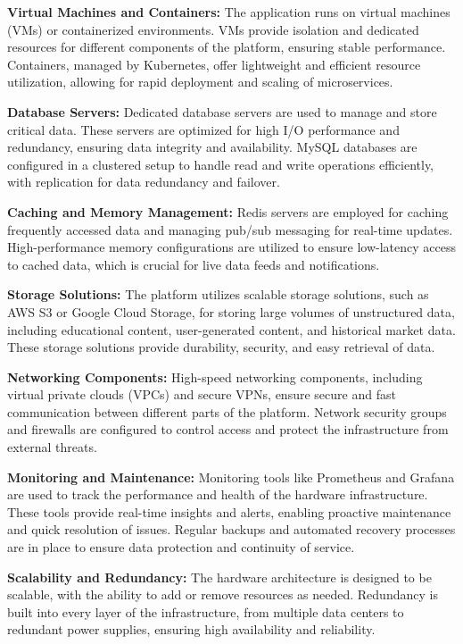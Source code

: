 \documentclass[12pt]{report}
\begin{document}
\textbf{Virtual Machines and Containers:} The application runs on virtual machines (VMs) or containerized environments. VMs provide isolation and dedicated resources for different components of the platform, ensuring stable performance. Containers, managed by Kubernetes, offer lightweight and efficient resource utilization, allowing for rapid deployment and scaling of microservices.

\textbf{Database Servers:} Dedicated database servers are used to manage and store critical data. These servers are optimized for high I/O performance and redundancy, ensuring data integrity and availability. MySQL databases are configured in a clustered setup to handle read and write operations efficiently, with replication for data redundancy and failover.

\textbf{Caching and Memory Management:} Redis servers are employed for caching frequently accessed data and managing pub/sub messaging for real-time updates. High-performance memory configurations are utilized to ensure low-latency access to cached data, which is crucial for live data feeds and notifications.

\textbf{Storage Solutions:} The platform utilizes scalable storage solutions, such as AWS S3 or Google Cloud Storage, for storing large volumes of unstructured data, including educational content, user-generated content, and historical market data. These storage solutions provide durability, security, and easy retrieval of data.

\textbf{Networking Components:} High-speed networking components, including virtual private clouds (VPCs) and secure VPNs, ensure secure and fast communication between different parts of the platform. Network security groups and firewalls are configured to control access and protect the infrastructure from external threats.

\textbf{Monitoring and Maintenance:} Monitoring tools like Prometheus and Grafana are used to track the performance and health of the hardware infrastructure. These tools provide real-time insights and alerts, enabling proactive maintenance and quick resolution of issues. Regular backups and automated recovery processes are in place to ensure data protection and continuity of service.

\textbf{Scalability and Redundancy:} The hardware architecture is designed to be scalable, with the ability to add or remove resources as needed. Redundancy is built into every layer of the infrastructure, from multiple data centers to redundant power supplies, ensuring high availability and reliability.
\end{document}
